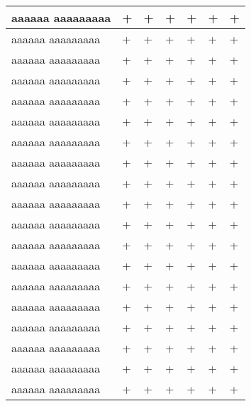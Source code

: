 \documentclass[12pt]{article}
\begin{document}
\begin{longtable}{|m{}|R{0.08\textwidth}|R{0.08\textwidth}|R{0.08\textwidth}|R{0.08\textwidth}|R{0.08\textwidth}|R{0.08\textwidth}|}
    aaaaaa \newline aaaaaaaaa & + & + & + & + & + & + \\ \hline
    aaaaaa \newline aaaaaaaaa & + & + & + & + & + & + \\ \hline
    aaaaaa \newline aaaaaaaaa & + & + & + & + & + & + \\ \hline
    aaaaaa \newline aaaaaaaaa & + & + & + & + & + & + \\ \hline
    aaaaaa \newline aaaaaaaaa & + & + & + & + & + & + \\ \hline
    aaaaaa \newline aaaaaaaaa & + & + & + & + & + & + \\ \hline
    aaaaaa \newline aaaaaaaaa & + & + & + & + & + & + \\ \hline
    aaaaaa \newline aaaaaaaaa & + & + & + & + & + & + \\ \hline
    aaaaaa \newline aaaaaaaaa & + & + & + & + & + & + \\ \hline
    aaaaaa \newline aaaaaaaaa & + & + & + & + & + & + \\ \hline
    aaaaaa \newline aaaaaaaaa & + & + & + & + & + & + \\ \hline
    aaaaaa \newline aaaaaaaaa & + & + & + & + & + & + \\ \hline
    aaaaaa \newline aaaaaaaaa & + & + & + & + & + & + \\ \hline
    aaaaaa \newline aaaaaaaaa & + & + & + & + & + & + \\ \hline
    aaaaaa \newline aaaaaaaaa & + & + & + & + & + & + \\ \hline
    aaaaaa \newline aaaaaaaaa & + & + & + & + & + & + \\ \hline
    aaaaaa \newline aaaaaaaaa & + & + & + & + & + & + \\ \hline
    aaaaaa \newline aaaaaaaaa & + & + & + & + & + & + \\ \hline
    aaaaaa \newline aaaaaaaaa & + & + & + & + & + & + \\ \hline

\end{longtable}
\end{document}
